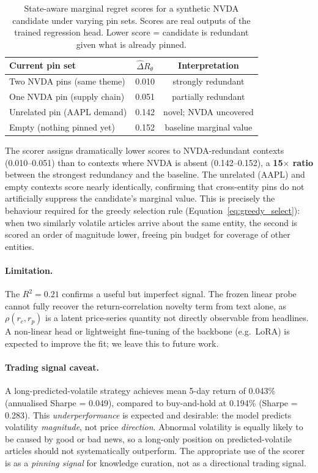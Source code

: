 \documentclass{article}
\begin{document}
\begin{table}[h]
\centering
\caption{State-aware marginal regret scores for a synthetic NVDA candidate under varying pin sets. Scores are real outputs of the trained regression head. Lower score = candidate is redundant given what is already pinned.}
\label{tab:marginal_scores}
\small
\begin{tabular}{@{}lcc@{}}
\toprule
\textbf{Current pin set} & \textbf{$\hat{\Delta}R_\theta$} & \textbf{Interpretation} \\
\midrule
Two NVDA pins (same theme)        & 0.010 & strongly redundant \\
One NVDA pin (supply chain)       & 0.051 & partially redundant \\
Unrelated pin (AAPL demand)       & 0.142 & novel; NVDA uncovered \\
Empty (nothing pinned yet)        & 0.152 & baseline marginal value \\
\bottomrule
\end{tabular}
\end{table}

The scorer assigns dramatically lower scores to NVDA-redundant contexts (0.010--0.051) than to contexts where NVDA is absent (0.142--0.152), a \textbf{15$\times$ ratio} between the strongest redundancy and the baseline.
The unrelated (AAPL) and empty contexts score nearly identically, confirming that cross-entity pins do not artificially suppress the candidate's marginal value.
This is precisely the behaviour required for the greedy selection rule (Equation~\eqref{eq:greedy_select}): when two similarly volatile articles arrive about the same entity, the second is scored an order of magnitude lower, freeing pin budget for coverage of other entities.

\paragraph{Limitation.}
The $R^2 = 0.21$ confirms a useful but imperfect signal.
The frozen linear probe cannot fully recover the return-correlation novelty term from text alone, as $\rho(r_c, r_p)$ is a latent price-series quantity not directly observable from headlines.
A non-linear head or lightweight fine-tuning of the backbone (e.g.\ LoRA) is expected to improve the fit; we leave this to future work.

\paragraph{Trading signal caveat.}
A long-predicted-volatile strategy achieves mean 5-day return of 0.043\% (annualised Sharpe = 0.049), compared to buy-and-hold at 0.194\% (Sharpe = 0.283).
This \emph{underperformance} is expected and desirable: the model predicts volatility \emph{magnitude}, not price \emph{direction}.
Abnormal volatility is equally likely to be caused by good or bad news, so a long-only position on predicted-volatile articles should not systematically outperform.
The appropriate use of the scorer is as a \emph{pinning signal} for knowledge curation, not as a directional trading signal.
\end{document}
